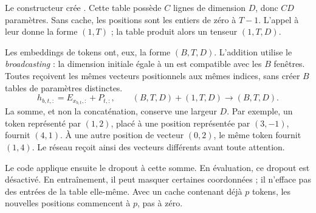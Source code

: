 


Le constructeur crée . Cette table possède $C$ lignes de dimension $D$, donc $CD$ paramètres. Sans cache, les positions sont les entiers de zéro à $T-1$. L'appel à  leur donne la forme $(1,T)$ ; la table produit alors un tenseur $(1,T,D)$.

Les embeddings de tokens ont, eux, la forme $(B,T,D)$. L'addition utilise le \emph{broadcasting} : la dimension initiale égale à un est compatible avec les $B$ fenêtres. Toutes reçoivent les mêmes vecteurs positionnels aux mêmes indices, sans créer $B$ tables de paramètres distinctes.
\[
 h_{b,t,:}=E_{x_{b,t},:}+P_{t,:},
 \qquad (B,T,D)+(1,T,D)\longrightarrow(B,T,D).
\]
La somme, et non la concaténation, conserve une largeur $D$. Par exemple, un token représenté par $(1,2)$, placé à une position représentée par $(3,-1)$, fournit $(4,1)$. À une autre position de vecteur $(0,2)$, le même token fournit $(1,4)$. Le réseau reçoit ainsi des vecteurs différents avant toute attention.

Le code applique ensuite le dropout à cette somme. En évaluation, ce dropout est désactivé. En entraînement, il peut masquer certaines coordonnées ; il n'efface pas des entrées de la table elle-même. Avec un cache contenant déjà $p$ tokens, les nouvelles positions commencent à $p$, pas à zéro.


